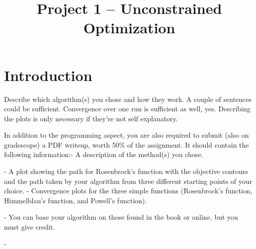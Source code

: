 \documentclass[conference]{IEEEtran}
\begin{document}
\title{\LARGE \textbf{Project 1 -- Unconstrained Optimization} 
}


\author{
} %


\maketitle

\begin{abstract}
\end{abstract}


\section{Introduction}
\label{sec:introduction}







Describe which algorithm(s) you chose and how they work. A couple of sentences could be sufficient. Convergence over one run is sufficient as well, yes. Describing the plots is only necessary if they're not self explanatory.

In addition to the programming aspect, you are also required to submit (also on gradescope) a PDF writeup, worth 50\% of the assignment. It should contain the following information:- A description of the method(s) you chose.

- A plot showing the path for Rosenbrock’s function with the objective contours and the path taken by your algorithm from three different starting points of your choice.
- Convergence plots for the three simple functions (Rosenbrock’s function, Himmelblau’s function, and Powell’s function).

- You can base your algorithm on those found in the book or online, but you must give credit.

- 
\end{document}
